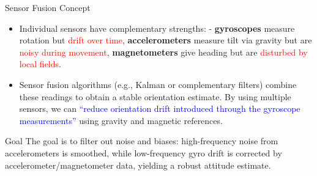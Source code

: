 \documentclass[aspectratio=169,xcolor=dvipsnames]{beamer}
\begin{document}
\begin{frame}{Sensor Fusion Concept}
\begin{itemize}
  \item Individual sensors have complementary strengths: 
    - \textbf{gyroscopes} measure rotation but \textcolor{red}{drift over time}, \textbf{accelerometers} measure tilt via gravity but are \textcolor{red}{noisy during movement}, \textbf{magnetometers} give heading but are \textcolor{red}{disturbed by local fields}.
  \item Sensor fusion algorithms (e.g., Kalman\cite{EKF}\cite{doubleEKF}\cite{quatEKF} or complementary filters\cite{compfilter}) combine these readings to obtain a stable orientation estimate. By using multiple sensors, we can \textcolor{blue}{“reduce orientation drift introduced through the gyroscope measurements”} using gravity and magnetic references.
\end{itemize}
\begin{block}{Goal}
    The goal is to filter out noise and biases: high-frequency noise from accelerometers is smoothed, while low-frequency gyro drift is corrected by accelerometer/magnetometer data, yielding a robust attitude estimate.
\end{block}
\end{frame}

\end{document}

